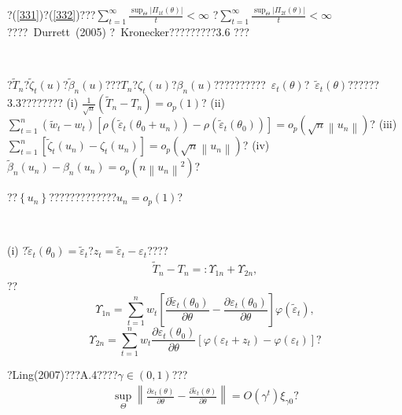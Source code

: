 \documentclass[a4paper,12pt,openany,oneside,utf-8]{ctexbook}
\newcommand{\xiaosihao}{\fontsize{12pt}{\baselineskip}\selectfont}
\begin{document}
	\noindent ?(\ref{331})?(\ref{332})???$\sum_{t=1}^{\infty} \frac{\sup _{\Theta}\left|\Pi_{1 t}(\theta)\right|}{t}<\infty$
	?$\sum_{t=1}^{\infty} \frac{\sup _{\Theta}\left|\Pi_{2 t}(\theta)\right|}{t}<\infty$????~Durrett~(2005) ?~Kronecker?????????3.6 ???
	
	\
	
	\noindent{\xiaosihao\heiti ??~3.7} ?$\tilde{T}_n$?$\tilde{\zeta}_t(u)$?$\tilde{\beta}_n(u)$???$T_n$?$\zeta_t(u)$?$\beta_n(u)$??????????~$\varepsilon_t(\theta)$?~$\tilde{\varepsilon}_t(\theta)$??????3.3????????
	\newline(i) $\frac{1}{\sqrt{n}}\left(\tilde{T}_{n}-T_{n}\right)=o_{p}(1)$?
	\newline(ii) $\sum_{t=1}^{n}\left(\tilde{w}_{t}-w_{t}\right)\left[\rho\left(\tilde{\varepsilon}_{t}\left(\theta_{0}+u_{n}\right)\right)-\rho\left(\tilde{\varepsilon}_{t}\left(\theta_{0}\right)\right)\right]=o_{p}\left(\sqrt{n}\left\|u_{n}\right\|\right)$?
	\newline(iii) $\sum_{t=1}^{n}\left[\tilde{\zeta}_{t}\left(u_{n}\right)-\zeta_{t}\left(u_{n}\right)\right]=o_{p}\left(\sqrt{n}\left\|u_{n}\right\|\right)$?
	\newline(iv) $\tilde{\beta}_{n}\left(u_{n}\right)-\beta_{n}\left(u_{n}\right)=o_{p}\left(n\left\|u_{n}\right\|^{2}\right)$?
	
	\noindent ??$\left\{u_n\right\}$?????????????$u_n=o_p(1)$?
	
	\
	
	\noindent{\xiaosihao\heiti ??~3.7??}
	
	\noindent (i) ?$\tilde{\varepsilon}_{t}\left(\theta_{0}\right)=\tilde{\varepsilon}_{t}$?$z_{t}=\tilde{\varepsilon}_{t}-\varepsilon_{t}$????
	\begin{align}\label{334}
		\tilde{T}_{n}-T_{n}=: \Upsilon_{1 n}+\Upsilon_{2 n} ,
	\end{align}
	??
	$$\Upsilon_{1 n}=\sum_{t=1}^{n} w_{t}\left[\frac{\partial \tilde{\varepsilon}_{t}\left(\theta_{0}\right)}{\partial \theta}-\frac{\partial \varepsilon_{t}\left(\theta_{0}\right)}{\partial \theta}\right]\varphi(\tilde{\varepsilon}_t),$$
	$$\Upsilon_{2 n}=\sum_{t=1}^{n} w_{t} \frac{\partial \varepsilon_{t}\left(\theta_{0}\right)}{\partial \theta}\left[\varphi(\varepsilon_t+z_t)-\varphi(\varepsilon_t)\right]\mbox{?}$$
	
	\noindent ?Ling(2007)???A.4????$\gamma\in(0,1)$???
	\begin{align}\label{335}
		\sup _{\Theta}\left\|\frac{\partial \varepsilon_{t}(\theta)}{\partial \theta}-\frac{\partial \tilde{\varepsilon}_{t}(\theta)}{\partial \theta}\right\|=O\left(\gamma^{t}\right) \xi_{\gamma 0}\mbox{?}\nonumber
	\end{align}
	
\end{document}
